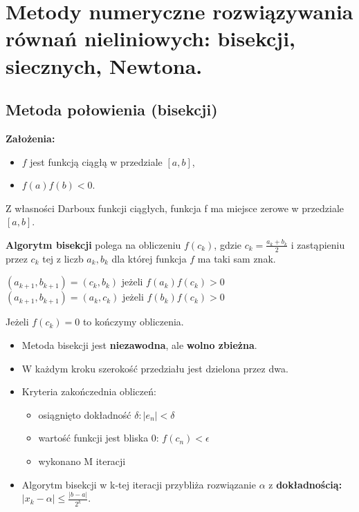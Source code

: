 \documentclass[12pt]{article}
\begin{document}
    \newpage

    \section{Metody numeryczne rozwiązywania równań nieliniowych: bisekcji, siecznych, Newtona.}

    \subsection{Metoda połowienia (bisekcji)}

    \textbf{Założenia:}
    \begin{itemize}
        \item $f$ jest funkcją ciągłą w przedziale $[a,b]$,
        \item $f(a)f(b) < 0$.
    \end{itemize}
    Z własności Darboux funkcji ciągłych, funkcja f ma miejsce zerowe w przedziale $[a,b]$.

    \begin{definition}
        \textbf{Algorytm bisekcji} polega na obliczeniu $f(c_k)$, gdzie $c_k = \frac{a_k + b_k}{2}$ i zastąpieniu przez
        $c_k$ tej z liczb $a_k, b_k$ dla której funkcja $f$ ma taki sam znak.
        \begin{center}
            $(a_{k+1}, b_{k+1}) = (c_k, b_k)$ jeżeli $f(a_k)f(c_k) > 0$\\
            $(a_{k+1}, b_{k+1}) = (a_k, c_k)$ jeżeli $f(b_k)f(c_k) > 0$
        \end{center}
        Jeżeli $f(c_k) = 0$ to kończymy obliczenia.
    \end{definition}
    \begin{itemize}
        \item Metoda bisekcji jest \textbf{niezawodna}, ale \textbf{wolno zbieżna}.
        \item W każdym kroku szerokość przedziału jest dzielona przez dwa.
        \item Kryteria zakończednia obliczeń:
        \begin{itemize}
            \item osiągnięto dokładność $\delta: |e_n| < \delta$
            \item wartość funkcji jest bliska 0: $f(c_n) < \epsilon$
            \item wykonano M iteracji
        \end{itemize}
        \item Algorytm bisekcji w k-tej iteracji przybliża rozwiązanie $\alpha$ z \textbf{dokładnością:} $|x_k - \alpha| \leq \frac{|b - a|}{2^k}$.
    \end{itemize}
\end{document}
